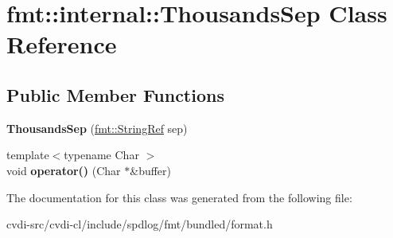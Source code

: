 \hypertarget{classfmt_1_1internal_1_1ThousandsSep}{}\section{fmt\+:\+:internal\+:\+:Thousands\+Sep Class Reference}
\label{classfmt_1_1internal_1_1ThousandsSep}
\subsection*{Public Member Functions}
\begin{DoxyCompactItemize}
\item 
{\bfseries Thousands\+Sep} (\hyperlink{classfmt_1_1BasicStringRef}{fmt\+::\+String\+Ref} sep)\hypertarget{classfmt_1_1internal_1_1ThousandsSep_a18736a7ad311be8ef0b25c92ecb5b933}{}\label{classfmt_1_1internal_1_1ThousandsSep_a18736a7ad311be8ef0b25c92ecb5b933}

\item 
{\footnotesize template$<$typename Char $>$ }\\void {\bfseries operator()} (Char $\ast$\&buffer)\hypertarget{classfmt_1_1internal_1_1ThousandsSep_a57a43bdd242e29d243c5301643f52b4a}{}\label{classfmt_1_1internal_1_1ThousandsSep_a57a43bdd242e29d243c5301643f52b4a}

\end{DoxyCompactItemize}


The documentation for this class was generated from the following file\+:\begin{DoxyCompactItemize}
\item 
cvdi-\/src/cvdi-\/cl/include/spdlog/fmt/bundled/format.\+h\end{DoxyCompactItemize}
